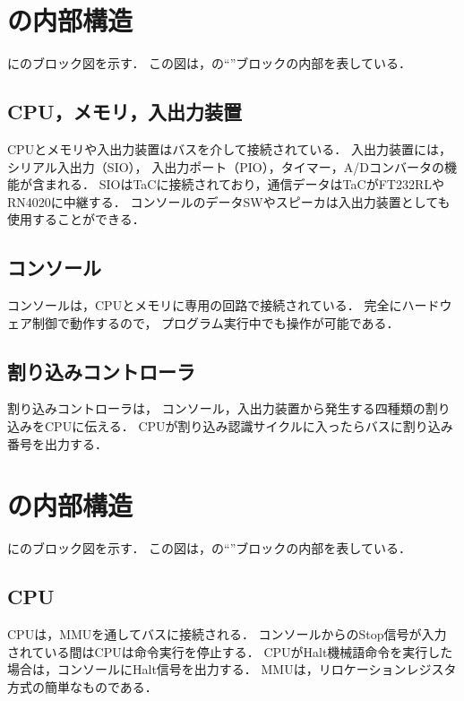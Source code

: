 \section{{\tec}の内部構造}

に{\tec}のブロック図を示す．
この図は，の``{\tec}''ブロックの内部を表している．


\subsection{CPU，メモリ，入出力装置}
CPUとメモリや入出力装置はバスを介して接続されている．
入出力装置には，シリアル入出力（SIO），
入出力ポート（PIO），タイマー，A/Dコンバータの機能が含まれる．
SIOはTaCに接続されており，通信データはTaCがFT232RLやRN4020に中継する．
コンソールのデータSWやスピーカは入出力装置としても使用することができる．

\subsection{コンソール}
コンソールは，CPUとメモリに専用の回路で接続されている．
完全にハードウェア制御で動作するので，
プログラム実行中でも操作が可能である．

\subsection{割り込みコントローラ}
割り込みコントローラは，
コンソール，入出力装置から発生する四種類の割り込みをCPUに伝える．
CPUが割り込み認識サイクルに入ったらバスに割り込み番号を出力する．

\section{{\tac}の内部構造}

に{\tac}のブロック図を示す．
この図は，の``{\tac}''ブロックの内部を表している．


\subsection{CPU}
CPUは，MMUを通してバスに接続される．
コンソールからのStop信号が入力されている間はCPUは命令実行を停止する．
CPUがHalt機械語命令を実行した場合は，コンソールにHalt信号を出力する．
MMUは，リロケーションレジスタ方式の簡単なものである．

